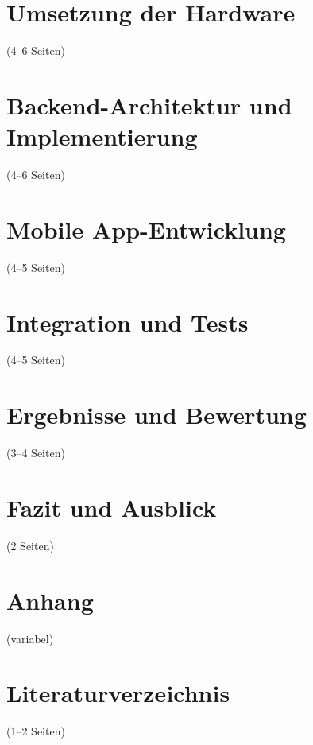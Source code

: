 \documentclass[a4paper, 12pt]{article} %
\begin{document}
\section{Umsetzung der Hardware}(4–6 Seiten)
    
\newpage

\section{Backend-Architektur und Implementierung}(4–6 Seiten)
    
\newpage

\section{Mobile App-Entwicklung}(4–5 Seiten)
    
\newpage

\section{Integration und Tests}(4–5 Seiten)
    
\newpage

\section{Ergebnisse und Bewertung}(3–4 Seiten)

\newpage

\section{Fazit und Ausblick}(2 Seiten)
    
\newpage

\section{Anhang}(variabel)
    
\newpage

\section{Literaturverzeichnis}(1–2 Seiten)
% 
\printbibliography    
\newpage
\end{document}
